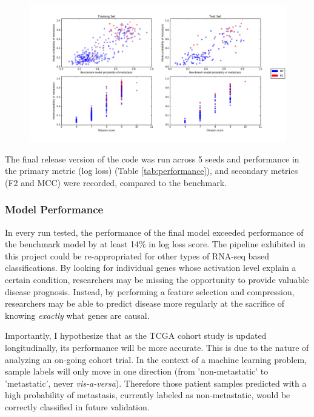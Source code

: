 \documentclass[final]{article}
\begin{document}
\begin{figure}[h!]
  \centering
    \includegraphics[scale=0.5]{PC3Gleason}
    \caption{\label{fig:FMscatter}}
\end{figure}

The final release version of the code was run across 5 seeds and performance in
the primary metric (log loss) (Table \ref{tab:performance}), and secondary
metrics (F2 and MCC) were recorded, compared to the benchmark.

\subsubsection{Model Performance}

In every run tested, the performance of the final model exceeded performance of
the benchmark model by at least 14\% in log loss score.  The pipeline exhibited
in this project could be re-appropriated for other types of RNA-seq based
classifications.  By looking for individual genes whose activation level explain
a certain condition, researchers may be missing the opportunity to provide
valuable disease prognosis.  Instead, by performing a feature selection and
compression, researchers may be able to predict disease more regularly at the
sacrifice of knowing \textit{exactly} what genes are causal.

Importantly, I hypothesize that as the TCGA cohort study is updated
longitudinally, its performance will be more accurate.  This is due to the
nature  of analyzing an on-going cohort trial.  In the context of a machine
learning problem,  sample labels will only move in one direction (from
'non-metastatic' to 'metastatic', never \textit{vis-a-versa}).  Therefore those
patient samples predicted with a high  probability of metastasis, currently
labeled as non-metastatic, would be correctly classified in future validation.
\end{document}
